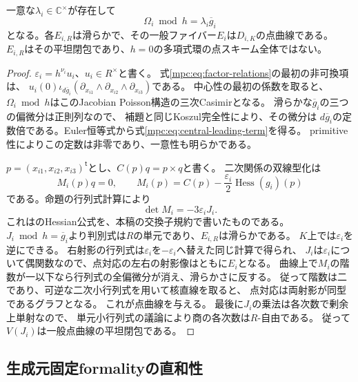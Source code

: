 \begin{lemma}[中心の先頭項と点曲線]\label{mpc:lem:primitive-point}
一意な$\lambda_i\in\mathbb C^\times$が存在して
\begin{equation}\label{mpc:eq:central-leading-term}
 \Omega_i\bmod h=\lambda_i\overline g_i
\end{equation}
となる。各$E_{i,R}$は滑らかで、その一般ファイバー$E_i$は$D_{i,K}$の点曲線である。
$E_{i,R}$はその平坦閉包であり、$h=0$の多項式環の点スキーム全体ではない。
\end{lemma}
\begin{proof}
$\varepsilon_i=h^{\nu_i}u_i$、$u_i\in R^\times$と書く。
式\eqref{mpc:eq:factor-relations}の最初の非可換項は、
$u_i(0)\iota_{d\overline g_i}
(\partial_{x_{i1}}\wedge\partial_{x_{i2}}\wedge\partial_{x_{i3}})$である。
中心性の最初の係数を取ると、$\Omega_i\bmod h$はこのJacobian Poisson構造の三次Casimirとなる。
滑らかな$\overline g_i$の三つの偏微分は正則列なので、
補題と同じKoszul完全性により、その微分は
$d\overline g_i$の定数倍である。Euler恒等式から式\eqref{mpc:eq:central-leading-term}を得る。
primitive性によりこの定数は非零であり、一意性も明らかである。

$p=(x_{i1},x_{i2},x_{i3})^{\mathsf t}$とし、$C(p)q=p\times q$と書く。
二次関係の双線型化は
\[
 M_i(p)q=0,
 \qquad M_i(p)=C(p)-\frac{\varepsilon_i}{2}\operatorname{Hess}(g_i)(p)
\]
である。命題の行列式計算により
\begin{equation}\label{mpc:eq:point-determinant}
 \det M_i=-3\varepsilon_i J_i.
\end{equation}
これは\cite[Theorem~7.2]{MoriSmith}のHessian公式を、本稿の交換子規約で書いたものである。
$J_i\bmod h=\overline g_i$より判別式は$R$の単元であり、$E_{i,R}$は滑らかである。
$K$上では$\varepsilon_i$を逆にできる。
右射影の行列式は$\varepsilon_i$を$-\varepsilon_i$へ替えた同じ計算で得られ、
$J_i$は$\varepsilon_i$について偶関数なので、点対応の左右の射影像はともに$E_i$となる。
曲線上で$M_i$の階数が一以下なら行列式の全偏微分が消え、滑らかさに反する。
従って階数は二であり、可逆な二次小行列式を用いて核直線を取ると、
点対応は両射影が同型であるグラフとなる。
これが点曲線を与える。
最後に$J_i$の乗法は各次数で剰余上単射なので、
単元小行列式の議論により商の各次数は$R$-自由である。
従って$V(J_i)$は一般点曲線の平坦閉包である。
\end{proof}

\subsection{生成元固定formalityの直和性}

